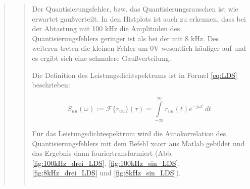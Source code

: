 \begin{quote}
\begin{quote}
        Der Quantisierungsfehler, bzw. das Quantisierungsrauschen ist wie erwartet gaußverteilt.
        In den Histplots ist auch zu erkennen, dass bei der Abtastung mit 100 kHz die Amplituden des
        Quantisierungsfehlers geringer ist als bei der mit 8 kHz. Des weiteren treten die kleinen Fehler um 0V
        wesentlich häufiger auf und es ergibt sich eine schmalere Gaußverteilung.
        
        \vspace{2em}
        
        Die Definition des Leistungsdichtspektrums ist in Formel \ref{eq:LDS} beschrieben:
        
        \begin{equation}
          S_{uu}(\omega):=\mathcal{F} \{r_{uu}\}(\tau)=\int\limits_{-\infty}^{\infty} r_{uu}(t)e^{-j \omega t} \ dt
          \label{eq:LDS}
        \end{equation}
        
        
        Für das Leistungsdichtespektrum wird die Autokorrelation des Quantisierungsfehlers mit dem Befehl xcorr aus
        Matlab gebildet und das Ergebnis dann fouriertransformiert (Abb. \ref{fig:100kHz_drei_LDS},
        \ref{fig:100kHz_sin_LDS}, \ref{fig:8kHz_drei_LDS} und \ref{fig:8kHz_sin_LDS}).
        
        \begin{center}
            \begin{tabular}{ll}
            

\end{tabular}
\end{center}
\end{quote}
\end{quote}
